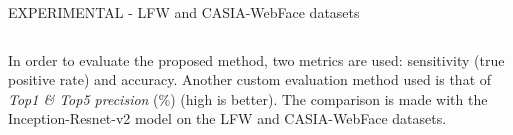 \begin{frame}{EXPERIMENTAL - LFW and CASIA-WebFace datasets}
\begin{minipage}{\linewidth}
\begin{minipage}{0.45\linewidth}
\begin{table}[h!]
\begin{adjustbox}{max width=\textwidth}
\begin{tabular}{|c|cc|cc|}
                    \hline    
                \end{tabular}
                \end{adjustbox}
                \label{T12}
            \end{table}
        \end{minipage}
        \hspace{0.05\linewidth}
        \begin{minipage}{0.45\linewidth}
            In order to evaluate the proposed method, two metrics are used: sensitivity 
            (true positive rate) and accuracy. Another custom evaluation method used 
            is that of \emph{Top1 \& Top5 precision} (\%) (high is better). The 
            comparison is made with the Inception-Resnet-v2 model on the LFW and 
            CASIA-WebFace datasets.
        \end{minipage}
    \end{minipage}
    
\end{frame}

